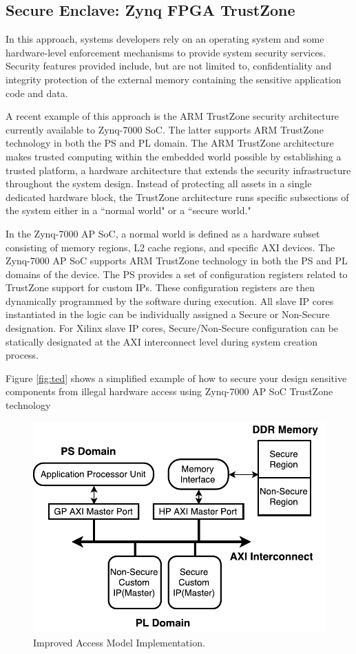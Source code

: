 \documentclass[sigconf]{acmart}
\theoremstyle{plain}
\theoremstyle{remark}
\begin{document}
\subsection{Secure Enclave: Zynq FPGA TrustZone}

In this approach, systems developers rely on an operating system and some hardware-level enforcement mechanisms to provide system security services. Security features provided include, but are not limited to, confidentiality and integrity protection of the external memory containing the sensitive application code and data.

A recent example of this approach is the ARM TrustZone security architecture currently available to Zynq-7000 SoC. The latter supports ARM TrustZone technology in both the PS and PL domain. The ARM TrustZone architecture makes trusted computing within the embedded world possible by establishing a trusted platform, a hardware architecture that extends the security infrastructure throughout the system design. Instead of protecting all assets in a single dedicated hardware block, the TrustZone architecture runs specific subsections of the system either in a ``normal world" or a ``secure world."

In the Zynq-7000 AP SoC, a normal world is defined as a hardware subset consisting of memory regions, L2 cache regions, and specific AXI devices. The Zynq-7000 AP SoC supports ARM TrustZone technology in both the PS and PL domains of the device. The PS provides a set of configuration registers related to TrustZone support for custom IPs. These configuration registers are then dynamically programmed by the software during execution. All slave IP cores instantiated in the logic can be individually assigned a Secure or Non-Secure designation. For Xilinx slave IP cores, Secure/Non-Secure configuration can be statically designated at the AXI interconnect level during system creation process.

Figure \ref{fig:ted} shows a simplified example of how to secure your design sensitive components from illegal hardware access using Zynq-7000 AP SoC TrustZone technology

\begin{figure}[hbt]
\centering
\includegraphics[width=0.75\columnwidth]{figures/TrustZoneHardware.pdf}
\caption{Improved Access Model Implementation.} %
\label{fig:trustzone}
\end{figure}
\end{document}
